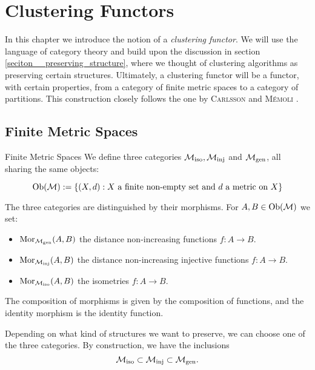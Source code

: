 \chapter{Clustering Functors}
\label{chapter__clustering_functor}

In this chapter we introduce the notion of a \emph{clustering functor}.
We will use the language of category theory and build upon the discussion in section \ref{seciton__preserving_structure}, where we thought of clustering algorithms as preserving certain structures.
Ultimately, a clustering functor will be a functor, with certain properties, from a category of finite metric spaces to a category of partitions.
This construction closely follows the one by \textsc{Carlsson} and \textsc{M\'emoli} \cite{Carlsson2010}.

\section{Finite Metric Spaces}
\label{section__finite_metric_spaces}



\begin{definition}{Finite Metric Spaces \cite[Sec.~3.2]{Carlsson2010}}{}
We define three categories ${\mathcal{M}_\mathrm{iso}}, {\mathcal{M}_\mathrm{inj}}$ and ${\mathcal{M}_\mathrm{gen}}$, all sharing the same objects:

\begin{equation*}
\mathrm {Ob}(\mathcal{M}) := \{(X,d): \text{$X$ a finite non-empty set and $d$ a metric on $X$}\}
\end{equation*}

The three categories are distinguished by their morphisms. For $A, B \in \mathrm {Ob}(\mathcal{M})$ we set:
\begin{itemize}
    \item $\mathrm {Mor}_{\mathcal{M}_\mathrm{gen}}(A,B)$ the distance non-increasing functions $f: A \to B$.
    \item $\mathrm {Mor}_{\mathcal{M}_\mathrm{inj}}(A,B)$ the distance non-increasing injective functions $f: A \to B$.
    \item $\mathrm {Mor}_{\mathcal{M}_\mathrm{iso}}(A,B)$ the isometries $f: A \to B$.
\end{itemize}
The composition of morphisms is given by the composition of functions, and the identity morphism is the identity function.
\end{definition}

Depending on what kind of structures we want to preserve, we can choose one of the three categories.
By construction, we have the inclusions
\begin{equation}
    \label{eq:inclusions_of_finite_metric_space_categories}
    {\mathcal{M}_\mathrm{iso}} \subset {\mathcal{M}_\mathrm{inj}} \subset {\mathcal{M}_\mathrm{gen}}.
\end{equation}

